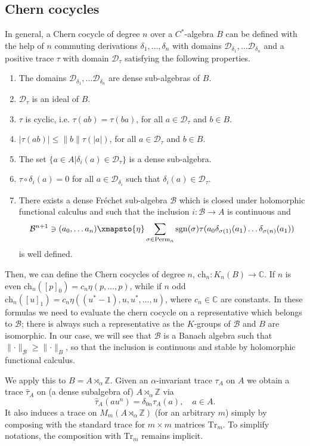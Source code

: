 \documentclass[11pt]{amsart}
\newcommand{\Z}{\mathbb{Z}}
\newcommand{\C}{\mathbb{C}}
\begin{document}
\subsection{Chern cocycles}
In general, a Chern cocycle of degree $n$ over a $C^*$-algebra $B$ can be defined with the help of $n$ commuting derivations $\delta_1,\dots, \delta_n$ with domains $\mathcal{D}_{\delta_1}, \dots \mathcal{D}_{\delta_n}$ and a positive trace $\tau$ with domain $\mathcal{D}_{\tau}$ satisfying the following properties. 
\begin{enumerate}
	\item The domains $\mathcal{D}_{\delta_1},\dots \mathcal{D}_{\delta_n}$ are dense sub-algebras of $B$.
	\item $\mathcal{D}_{\tau}$ is an ideal of $B$.
	\item $\tau$ is cyclic, i.e. $\tau(ab)=\tau(ba)$, for all $a\in \mathcal{D}_{\tau}$ and $b\in B$.
	\item $\lvert \tau(ab) \rvert \le \lVert b\rVert \tau(\lvert a\rvert)$, for all $a\in \mathcal{D}_{\tau}$ and $b\in B$.
	\item The set $\{a\in A|\delta_i(a)\in \mathcal{D}_{\tau}\}$ is a dense sub-algebra.
	\item $\tau\circ \delta_i(a)=0$ for all $a\in \mathcal{D}_{\delta_i}$ such that $\delta_i(a)\in \mathcal{D}_{\tau}$.
	\item There exists a dense Fréchet sub-algebra $\mathcal B$ which is closed under holomorphic functional calculus and such that the inclusion $i:\mathcal{B}\rightarrow A $ is continuous and 
	$$\mathcal{B}^{n+1}\ni (a_0,\dots a_n)\xmapsto{\eta} \sum_{\sigma\in \mathrm{Perm}_n}\mathrm{sgn}(\sigma)\tau(a_0\delta_{\sigma(1)}(a_1)\dots\delta_{\sigma(n)}(a_1))$$
	is well defined.    
\end{enumerate}
Then, we can define the Chern cocycles of degree $n$, $\mathrm{ch}_n:K_n(B)\rightarrow\C$. If $n$ is even $\mathrm{ch}_n([p]_0)=c_n \eta(p,\dots, p)$,
while if $n$ odd $\mathrm{ch}_n([u]_1)=c_n \eta((u^*-1),u,u^*,\dots, u)$, where $c_n\in\C$ are constants. In these formulas we need to evaluate the chern cocycle on a representative which belongs to $\mathcal B$; there is always such a representative as the $K$-groups of $\mathcal B$ and $B$ are isomorphic. 
In our case, we will see that $\mathcal{B}$ is a Banach algebra such that $\lVert \cdot\rVert_\mathcal{B}\ge \lVert \cdot\rVert_B$, so that the inclusion is continuous and stable by holomorphic functional calculus. 


We apply this to $B=A\rtimes_\alpha \Z$. 
Given an $\alpha$-invariant trace $\tau_A$ on $A$ we obtain a trace $\hat{\tau}_A$ on (a dense subalgebra of) $A\rtimes_\alpha \Z$ via
\begin{equation}\label{tau_hat}
	\hat{\tau}_A(au^n)=\delta_{0n}\tau_A(a), \quad a\in A.
\end{equation}
It also induces a trace on $M_m(A\rtimes_\alpha \Z)$ (for an arbitrary $m$) simply by composing with the standard trace for $m\times m$ matrices $\mathrm{Tr}_m$. To simplify notations, the composition with $\mathrm{Tr}_m$ remains implicit.
\end{document}
